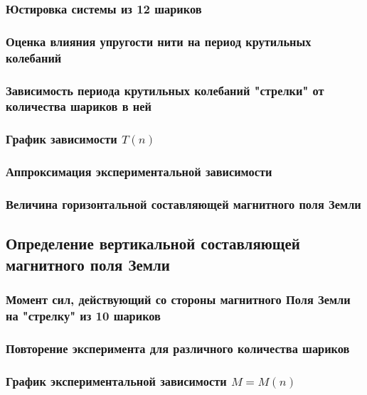 \documentclass[a4paper, 12pt]{article}
\begin{document}
            \subsubsection{Юстировка системы из 12 шариков}

            \subsubsection{Оценка влияния упругости нити на период крутильных колебаний}

            \subsubsection{Зависимость периода крутильных колебаний "стрелки" от количества шариков в ней}

            \subsubsection{График зависимости $T(n)$}

            \subsubsection{Аппроксимация экспериментальной зависимости}

            \subsubsection{Величина горизонтальной составляющей магнитного поля Земли}

        \subsection{Определение вертикальной составляющей магнитного поля Земли}

            \subsubsection{Момент сил, действующий со стороны магнитного Поля Земли на "стрелку" из 10 шариков}

            \subsubsection{Повторение эксперимента для различного количества шариков}

            \subsubsection{График экспериментальной зависимости $M = M(n)$}
\end{document}
